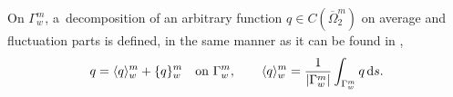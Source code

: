 

On $\Gamma^m_w$, a~decomposition of an arbitrary function $q\in C(\overbar\Omega^m_2)$ on average and fluctuation parts
is defined, in the same manner as it can be found in \cite{koppl_vidotto_2018},
\begin{equation}\label{eqn:average_decomposition}
    q = \langle q\rangle^m_w + \{q\}^m_w \quad \textrm{on } \Gamma^m_w, \qquad \langle q\rangle^m_w = \frac{1}{{\left|\Gamma^m_w\right|}} \int_{\Gamma^m_w} q \,{\rm d} s.
\end{equation}
%     



